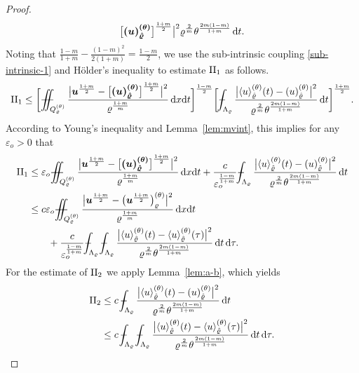 \documentclass[a4paper, 10pt, american]{amsart}
\numberwithin{theorem}{section}
\numberwithin{equation}{section}
\newcommand{\dxdt}{\,\mathrm{d}x\mathrm{d}t}
\renewcommand{\d}{\,\mathrm{d}}
\newcommand{\dt}{\,\mathrm{d}t}
\renewcommand{\epsilon}{\varepsilon}
\renewcommand{\epsilon}{\varepsilon}
\renewcommand{\rho}{\varrho}
\newcommand{\power}[2]{\bm{#1^{\mbox{\unboldmath{\scriptsize$#2$}}}}}
\def\Xint#1{\mathchoice
    {\XXint\displaystyle\textstyle{#1}}%
    {\XXint\textstyle\scriptstyle{#1}}%
    {\XXint\scriptstyle\scriptscriptstyle{#1}}%
    {\XXint\scriptscriptstyle\scriptscriptstyle{#1}}%
    \!\int}
\def\XXint#1#2#3{\setbox0=\hbox{$#1{#2#3}{\int}$}
    \vcenter{\hbox{$#2#3$}}\kern-0.5\wd0}
\def\bint{\Xint-}
\def\Xiint#1{\mathchoice
    {\XXiint\displaystyle\textstyle{#1}}%
    {\XXiint\textstyle\scriptstyle{#1}}%
    {\XXiint\scriptstyle\scriptscriptstyle{#1}}%
    {\XXiint\scriptscriptstyle\scriptscriptstyle{#1}}%
    \!\iint}
\def\XXiint#1#2#3{\setbox0=\hbox{$#1{#2#3}{\iint}$}
    \vcenter{\hbox{$#2#3$}}\kern-0.5\wd0}
\def\biint{\Xiint{-\!-}}
\def\<{\langle}
\def\>{\rangle}
\begin{document}
\begin{proof}
\begin{align*}
{  \power{\big[ (u)_{\hat{\rho}}^{(\theta)} \big]}{\frac{1+m}2} \big|^2
  }{\rho^{\frac{2}m} \theta^{\frac{2m(1-m)}{1+m}}} \dt .
\end{align*}
Noting that $\frac{1-m}{1+m}-\frac{(1-m)^2}{2(1+m)} = \frac{1-m}2$, we
use the sub-intrinsic coupling \eqref{sub-intrinsic-1} and H\"older's inequality to estimate
${\rm{II}_1}$ as follows.
\begin{align*}
{\rm{II}_1}
\le
\bigg[ \biint_{Q_{\rho}^{(\theta)}}\frac{\big|\power u{\frac{1+m}2} - \power{\big[ (u)_{\hat{\rho}}^{(\theta)}\big]}{\frac{1+m}2}\big|^2}{\rho^{\frac{1+m}m}} \dxdt \bigg]^{\frac{1-m}2}
\bigg[\bint_{\Lambda_\rho}\frac{\big| \<u\>_{\hat{\rho}}^{(\theta)}(t) - (u)_{\hat{\rho}}^{(\theta)} \big|^{2}}{\rho^{\frac{2}m} \theta^{\frac{2m(1-m)}{1+m}}} \dt\bigg]^{\frac{1+m}2}. 
\end{align*}
According to Young's inequality and Lemma~\ref{lem:mvint}, this
implies for any $\epsilon_o>0$ that 
\begin{align}\label{est-II1-a}\nonumber
{\rm{II}_1}
&\le
\epsilon_o \biint_{Q_{\rho}^{(\theta)}}\frac{\big|\power u{\frac{1+m}2} - \power{\big[ (u)_{\hat{\rho}}^{(\theta)}\big]}{\frac{1+m}2}\big|^2}{\rho^{\frac{1+m}m}} \dxdt 
+
\frac{c}{\epsilon_o^{\frac{1-m}{1+m}}}\bint_{\Lambda_\rho}\frac{\big| \<u\>_{\hat{\rho}}^{(\theta)}(t) - (u)_{\hat{\rho}}^{(\theta)} \big|^{2}}{\rho^{\frac{2}m} \theta^{\frac{2m(1-m)}{1+m}}} \dt \\\nonumber
&\le
c\epsilon_o \biint_{Q_{\rho}^{(\theta)}}\frac{\big|\power u{\frac{1+m}2} - \big(\power{u}{\frac{1+m}2}\big)_{\rho}^{(\theta)}\big|^2}{\rho^{\frac{1+m}m}} \dxdt \\
&\qquad+
\frac{c}{\epsilon_o^{\frac{1-m}{1+m}}}\bint_{\Lambda_\rho}\bint_{\Lambda_\rho}\frac{\big| \<u\>_{\hat{\rho}}^{(\theta)}(t) - \<u\>_{\hat{\rho}}^{(\theta)}(\tau) \big|^{2}}{\rho^{\frac{2}m} \theta^{\frac{2m(1-m)}{1+m}}} \dt \d\tau.
\end{align}
For the estimate of ${\rm{II}_2}$ we apply Lemma~\ref{lem:a-b}, which
yields 
\begin{align}
{\rm{II}_2}\label{est-II2-a}\nonumber
&\le
c\,\bint_{\Lambda_\rho}\frac{  \big| \<u\>_{\hat{\rho}}^{(\theta)}(t) - (u)_{\hat{\rho}}^{(\theta)} \big|^{2}}{\rho^{\frac{2}m} \theta^{\frac{2m(1-m)}{1+m}}} \dt\\
&\le
c\,\bint_{\Lambda_\rho}\bint_{\Lambda_\rho}\frac{\big| \<u\>_{\hat{\rho}}^{(\theta)}(t) - \<u\>_{\hat{\rho}}^{(\theta)}(\tau) \big|^{2}}{\rho^{\frac{2}m} \theta^{\frac{2m(1-m)}{1+m}}} \dt \d\tau.
\end{align}

\end{proof}
\end{document}
